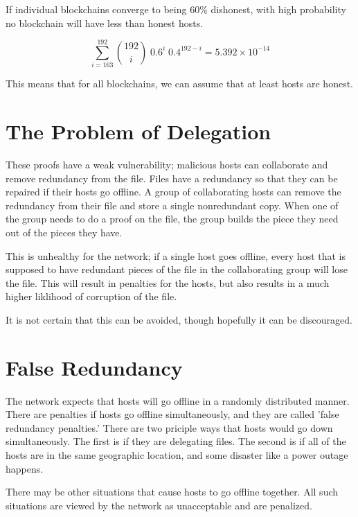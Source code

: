 \documentclass[twocolumn]{article}
\begin{document}
If individual blockchains converge to being 60\% dishonest, with high probability no blockchain will have less than \inversemaxcorruption{} honest hosts.

\begin{equation}
\sum_{i=163}^{192} {192 \choose i} \; 0.6^{i} \; 0.4^{192-i} = 5.392\times10^{-14}
\end{equation}

This means that for all blockchains, we can assume that at least \inversemaxcorruption{} hosts are honest.

\section{The Problem of Delegation}

These proofs have a weak vulnerability; malicious hosts can collaborate and remove redundancy from the file.
Files have a redundancy so that they can be repaired if their hosts go offline.
A group of collaborating hosts can remove the redundancy from their file and store a single nonredundant copy.
When one of the group needs to do a proof on the file, the group builds the piece they need out of the pieces they have.

This is unhealthy for the network; if a single host goes offline, every host that is supposed to have redundant pieces of the file in the collaborating group will lose the file.
This will result in penalties for the hosts, but also results in a much higher liklihood of corruption of the file.

It is not certain that this can be avoided, though hopefully it can be discouraged.

\section{False Redundancy}

The network expects that hosts will go offline in a randomly distributed manner.
There are penalties if hosts go offline simultaneously, and they are called 'false redundancy penalties.'
There are two priciple ways that hosts would go down simultaneously.
The first is if they are delegating files.
The second is if all of the hosts are in the same geographic location, and some disaster like a power outage happens.

There may be other situations that cause hosts to go offline together.
All such situations are viewed by the network as unacceptable and are penalized.
\end{document}
